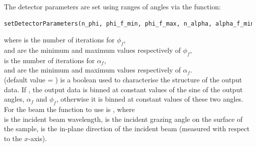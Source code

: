 The detector parameters are set using ranges of angles via
the function:

\begin{lstlisting}[language=python, style=eclipse,numbers=none]
setDetectorParameters(n_phi, phi_f_min, phi_f_max, n_alpha, alpha_f_min, alpha_f_max, isgisaxs_style=false)},
\end{lstlisting}


\noindent where  is the number of iterations for $\phi_f$,\\  and 
are the minimum and maximum values respectively of $\phi_f$, \\  is
the number of iterations for $\alpha_f$,\\  and  
are the minimum and maximum values respectively of
$\alpha_f$. \\
 (default value = ) is a boolean
used to characterise the structure of the output data. If
, the output data is binned at constant
values of the sine of the output angles, $\alpha_f$ and $\phi_f$, otherwise it is binned
at constant values of these two angles.\\


\noindent For the beam the function to use is
, where\\
 is the incident beam wavelength,
 is the incident
grazing angle on the surface of the sample,
 is the in-plane
direction of the incident beam (measured with respect to the
$x$-axis).




%
